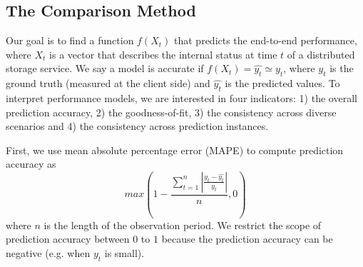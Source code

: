 

\subsection{The Comparison Method}
Our goal is to find a function $f(X_t)$ that predicts the end-to-end performance, where $X_t$ is a vector that describes the internal status at time $t$ of a distributed storage service.
We say a model is accurate if $f(X_t)=\hat{y_t} \simeq y_t$, where $y_t$ is the ground truth (measured at the client side) and $\hat{y_t}$ is the predicted values.
To interpret performance models, we are interested in four indicators:
1) the overall prediction accuracy,
2) the goodness-of-fit,
3) the consistency across diverse scenarios and
4) the consistency across prediction instances.

First, we use mean absolute percentage error (MAPE) to compute prediction accuracy as 
\setlength{\abovedisplayskip}{0pt} \setlength{\abovedisplayshortskip}{0pt}
\begin{equation} \label{eq:prediction_accuracy}
max(1 - \frac{\sum_{t=1}^{n} {|\frac{y_t - \hat{y_t}}{y_t}|}}{n}, 0)
\end{equation}
where $n$ is the length of the observation period.
We restrict the scope of prediction accuracy between $0$ to $1$ because the prediction accuracy can be negative (e.g. when $y_t$ is small).

